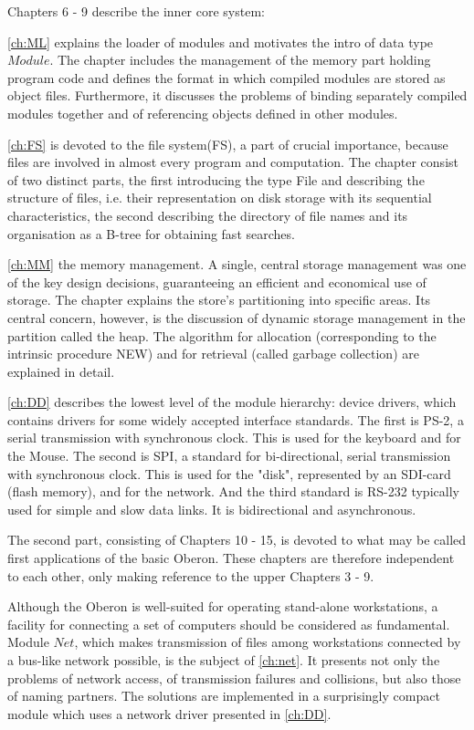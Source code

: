 Chapters 6 - 9 describe the inner core system:

\ref{ch:ML} explains the loader of modules and motivates the intro of data type $Module$.
The chapter includes the management of the memory part holding program code and defines the format
in which compiled modules are stored as object files. Furthermore, it discusses the problems of
binding separately compiled modules together and of referencing objects defined in other modules.

\ref{ch:FS} is devoted to the file system(FS), a part of crucial importance, because files are involved in
almost every program and computation. The chapter consist of two distinct parts, the first
introducing the type File and describing the structure of files, i.e. their representation on disk
storage with its sequential characteristics, the second describing the directory of file names and
its organisation as a B-tree for obtaining fast searches.

\ref{ch:MM} the memory management. A single, central storage management
was one of the key design decisions, guaranteeing an efficient and economical use of storage. The
chapter explains the store's partitioning into specific areas. Its central concern, however, is the
discussion of dynamic storage management in the partition called the heap. The algorithm for
allocation (corresponding to the intrinsic procedure NEW) and for retrieval (called garbage
collection) are explained in detail.

\ref{ch:DD} describes the lowest level of the module hierarchy: device drivers,
which contains drivers for some widely accepted interface standards. The first is PS-2, a serial
transmission with synchronous clock. This is used for the keyboard and for the Mouse. The second
is SPI, a standard for bi-directional, serial transmission with synchronous clock. This is used for
the "disk", represented by an SDI-card (flash memory), and for the network. And the third standard
is RS-232 typically used for simple and slow data links. It is bidirectional and asynchronous.

The second part, consisting of Chapters 10 - 15, is devoted to what may be called first
applications of the basic Oberon. These chapters are therefore independent to each other,
only making reference to the upper Chapters 3 - 9.

Although the Oberon is well-suited for operating stand-alone workstations, a facility for
connecting a set of computers should be considered as fundamental. Module $Net$, which makes
transmission of files among workstations connected by a bus-like network possible, is the subject of
\ref{ch:net}. It presents not only the problems of network access, of transmission failures and
collisions, but also those of naming partners. The solutions are implemented in a surprisingly
compact module which uses a network driver presented in \ref{ch:DD}.

